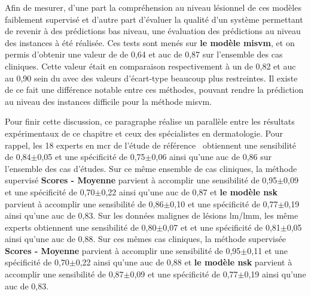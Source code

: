 Afin de mesurer, d'une part la compréhension au niveau lésionnel de ces modèles faiblement supervisé et d'autre part d'évaluer la qualité d'un système permettant de revenir à des prédictions bas niveau, une évaluation des prédictions au niveau des instances à été réalisée. Ces tests sont menés sur \textbf{le modèle \gls{misvm}}, et on permis d'obtenir une valeur de \fscore{} de 0,64 et \gls{auc} de 0,87 sur l'ensemble des cas cliniques. Cette valeur était en comparaison respectivement à un \fscore{} de 0,82 et \gls{auc} au 0,90 sein du  avec des valeurs d'écart-type beaucoup plus restreintes. Il existe de ce fait une différence notable entre ces méthodes, pouvant rendre la prédiction au niveau des instances difficile pour la méthode \gls{misvm}.\par

Pour finir cette discussion, ce paragraphe réalise un parallèle entre les résultats expérimentaux de ce chapitre et ceux des spécialistes en dermatologie. Pour rappel, les 18 experts en \gls{mcr} de l’étude de référence~\cite{Cinotti2016} obtiennent une sensibilité de 0,84$\pm$0,05 et une spécificité de 0,75$\pm$0,06 ainsi qu'une \gls{auc} de 0,86 sur l'ensemble des cas d'études. Sur ce même ensemble de cas cliniques, la méthode supervisé \textbf{Scores - Moyenne} parvient à accomplir une sensibilité de 0,95$\pm$0,09 et une spécificité de 0,70$\pm$0,22 ainsi qu'une \gls{auc} de 0,87 et \textbf{le modèle \gls{nsk}} parvient à accomplir une sensibilité de 0,86$\pm$0,10 et une spécificité de 0,77$\pm$0,19 ainsi qu'une \gls{auc} de 0,83. Sur les données malignes de lésions \gls{lm}/\gls{lmm}, les même experts obtiennent une sensibilité de 0,80$\pm$0,07 et et une spécificité de 0,81$\pm$0,05 ainsi qu'une \gls{auc} de 0,88. Sur ces mêmes cas cliniques, la méthode supervisée \textbf{Scores - Moyenne} parvient à accomplir une sensibilité de 0,95$\pm$0,11 et une spécificité de 0,70$\pm$0,22 ainsi qu'une \gls{auc} de 0,88 et \textbf{le modèle \gls{nsk}} parvient à accomplir une sensibilité de 0,87$\pm$0,09 et une spécificité de 0,77$\pm$0,19 ainsi qu'une \gls{auc} de 0,83.\par